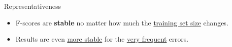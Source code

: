 \documentclass[10pt, export]{beamer}
\begin{document}
        \begin{frame}{Representativeness}
            \begin{figure}
                
            \end{figure}
            \begin{itemize}[label=$\blacktriangleright$, font=\color{IGNGreen}]
                \item<2-> \footnotesize F-scores are \textbf{stable} no matter how much the \underline{training set size} changes.
                \item<3-> \footnotesize Results are even \underline{more stable} for the \underline{very frequent} errors.
            \end{itemize}
        \end{frame}
\end{document}
